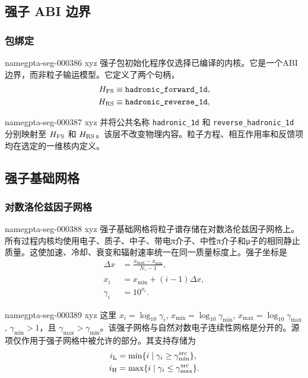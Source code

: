 \documentclass[twocolumn]{aastex702}
\makeatletter
\providecommand{\gptareaderanchor}[1]{\pdfdest name{#1} xyz}%
\providecommand{\gptareaderanchor}[1]{\special{pdf:dest (#1) [ @thispage /XYZ @xpos @ypos null ]}}%
\makeatother
\begin{document}
\subsection{强子 ABI 边界}

\subsubsection{包绑定}


\gptareaderanchor{gpta-seg-000386}%
强子包初始化程序仅选择已编译的内核。它是一个ABI边界，而非粒子输运模型。它定义了两个句柄，
\begin{equation}
\begin{aligned}
H_{\rm FS}&\equiv\texttt{hadronic\_forward\_1d},\\
H_{\rm RS}&\equiv\texttt{hadronic\_reverse\_1d},
\end{aligned}
\end{equation}

\gptareaderanchor{gpta-seg-000387}%
并将公共名称 \texttt{hadronic\_1d} 和 \texttt{reverse\_hadronic\_1d} 分别映射至 \(H_{\rm FS}\) 和 \(H_{\rm RS}\)。该层不改变物理内容。粒子方程、相互作用率和反馈项均在选定的一维核内定义。

\subsection{强子基础网格}

\subsubsection{对数洛伦兹因子网格}


\gptareaderanchor{gpta-seg-000388}%
强子基础网格将粒子谱存储在对数洛伦兹因子网格上。所有过程内核均使用电子、质子、中子、带电π介子、中性π介子和μ子的相同静止质量。这使加速、冷却、衰变和辐射速率统一在同一质量标度上。强子坐标是
\begin{equation}
\begin{aligned}
\Delta x&=\frac{x_{\max}-x_{\min}}{N_\gamma-1},\\
x_i&=x_{\min}+(i-1)\Delta x,\\
\gamma_i&=10^{x_i}.
\end{aligned}
\end{equation}

\gptareaderanchor{gpta-seg-000389}%
这里 \(x_i=\log_{10}\gamma_i\), \(x_{\min}=\log_{10}\gamma_{\min}\),
\(x_{\max}=\log_{10}\gamma_{\max}\), \(\gamma_{\min}>1\)，且
\(\gamma_{\max}>\gamma_{\min}\)。该强子网格与自然对数电子连续性网格是分开的。源项仅作用于强子网格中被允许的部分。其支持存储为
\begin{equation}
\begin{aligned}
i_{\rm L}&=\min\{i\mid \gamma_i\ge\gamma_{\min}^{\rm src}\},\\
i_{\rm H}&=\max\{i\mid \gamma_i\le\gamma_{\max}^{\rm src}\}.
\end{aligned}
\end{equation}
\end{document}
